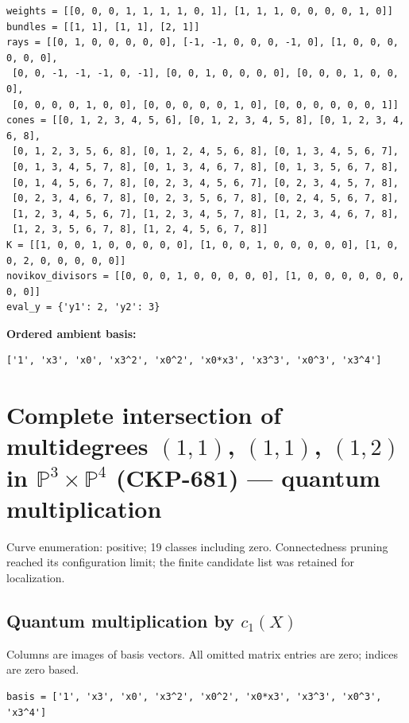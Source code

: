 \documentclass[10pt,a4paper]{article}
\begin{document}
\begin{lstlisting}
weights = [[0, 0, 0, 1, 1, 1, 1, 0, 1], [1, 1, 1, 0, 0, 0, 0, 1, 0]]
bundles = [[1, 1], [1, 1], [2, 1]]
rays = [[0, 1, 0, 0, 0, 0, 0], [-1, -1, 0, 0, 0, -1, 0], [1, 0, 0, 0, 0, 0, 0],
 [0, 0, -1, -1, -1, 0, -1], [0, 0, 1, 0, 0, 0, 0], [0, 0, 0, 1, 0, 0, 0],
 [0, 0, 0, 0, 1, 0, 0], [0, 0, 0, 0, 0, 1, 0], [0, 0, 0, 0, 0, 0, 1]]
cones = [[0, 1, 2, 3, 4, 5, 6], [0, 1, 2, 3, 4, 5, 8], [0, 1, 2, 3, 4, 6, 8],
 [0, 1, 2, 3, 5, 6, 8], [0, 1, 2, 4, 5, 6, 8], [0, 1, 3, 4, 5, 6, 7],
 [0, 1, 3, 4, 5, 7, 8], [0, 1, 3, 4, 6, 7, 8], [0, 1, 3, 5, 6, 7, 8],
 [0, 1, 4, 5, 6, 7, 8], [0, 2, 3, 4, 5, 6, 7], [0, 2, 3, 4, 5, 7, 8],
 [0, 2, 3, 4, 6, 7, 8], [0, 2, 3, 5, 6, 7, 8], [0, 2, 4, 5, 6, 7, 8],
 [1, 2, 3, 4, 5, 6, 7], [1, 2, 3, 4, 5, 7, 8], [1, 2, 3, 4, 6, 7, 8],
 [1, 2, 3, 5, 6, 7, 8], [1, 2, 4, 5, 6, 7, 8]]
K = [[1, 0, 0, 1, 0, 0, 0, 0, 0], [1, 0, 0, 1, 0, 0, 0, 0, 0], [1, 0, 0, 2, 0, 0, 0, 0, 0]]
novikov_divisors = [[0, 0, 0, 1, 0, 0, 0, 0, 0], [1, 0, 0, 0, 0, 0, 0, 0, 0]]
eval_y = {'y1': 2, 'y2': 3}
\end{lstlisting}

\textbf{Ordered ambient basis:}
\begin{lstlisting}
['1', 'x3', 'x0', 'x3^2', 'x0^2', 'x0*x3', 'x3^3', 'x0^3', 'x3^4']
\end{lstlisting}

\clearpage\section*{Complete intersection of multidegrees $(1,1)$, $(1,1)$, $(1,2)$ in $\mathbb P^{3}\times \mathbb P^{4}$ (CKP-681) --- quantum multiplication}

Curve enumeration: positive; 19 classes including zero.
Connectedness pruning reached its configuration limit; the finite candidate list was retained for localization.
\subsection*{Quantum multiplication by $c_1(X)$}
Columns are images of basis vectors. All omitted matrix entries are zero; indices are zero based.

\begin{lstlisting}
basis = ['1', 'x3', 'x0', 'x3^2', 'x0^2', 'x0*x3', 'x3^3', 'x0^3', 'x3^4']
\end{lstlisting}
\end{document}
